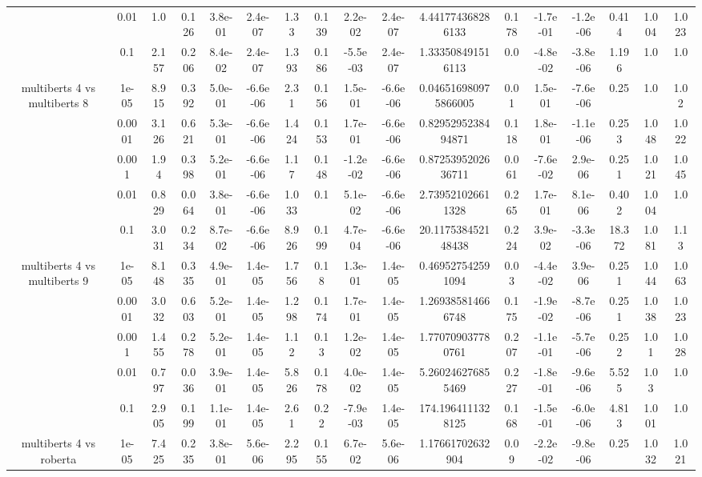 \begin{tabular}{|c|c|c|c|c|c|c|c|c|c|c|c|c|c|c|c|c|}
 & 0.01 & 1.0 & 0.126 & 3.8e-01 & 2.4e-07 & 1.33 & 0.139 & 2.2e-02 & 2.4e-07 & 4.441774368286133 & 0.178 & -1.7e-01 & -1.2e-06 & 0.414 & 1.004 & 1.023 \\
 & 0.1 & 2.157 & 0.206 & 8.4e-02 & 2.4e-07 & 1.393 & 0.186 & -5.5e-03 & 2.4e-07 & 1.333508491516113 & 0.0 & -4.8e-02 & -3.8e-06 & 1.196 & 1.0 & 1.0 \\
\hline
\multirow{5}{*}{multiberts 4 vs multiberts 8} & 1e-05 & 8.915 & 0.392 & 5.0e-01 & -6.6e-06 & 2.31 & 0.156 & 1.5e-01 & -6.6e-06 & 0.046516980975866005 & 0.01 & 1.5e-01 & -7.6e-06 & 0.25 & 1.0 & 1.02 \\
 & 0.0001 & 3.126 & 0.621 & 5.3e-01 & -6.6e-06 & 1.424 & 0.153 & 1.7e-01 & -6.6e-06 & 0.8295295238494871 & 0.118 & 1.8e-01 & -1.1e-06 & 0.253 & 1.048 & 1.022 \\
 & 0.001 & 1.94 & 0.398 & 5.2e-01 & -6.6e-06 & 1.17 & 0.148 & -1.2e-02 & -6.6e-06 & 0.8725395202636711 & 0.061 & -7.6e-02 & 2.9e-06 & 0.251 & 1.021 & 1.045 \\
 & 0.01 & 0.829 & 0.064 & 3.8e-01 & -6.6e-06 & 1.033 & 0.1 & 5.1e-02 & -6.6e-06 & 2.739521026611328 & 0.265 & 1.7e-01 & 8.1e-06 & 0.402 & 1.004 & 1.0 \\
 & 0.1 & 3.031 & 0.234 & 8.7e-02 & -6.6e-06 & 8.926 & 0.199 & 4.7e-04 & -6.6e-06 & 20.117538452148438 & 0.224 & 3.9e-02 & -3.3e-06 & 18.372 & 1.081 & 1.13 \\
\hline
\multirow{5}{*}{multiberts 4 vs multiberts 9} & 1e-05 & 8.148 & 0.335 & 4.9e-01 & 1.4e-05 & 1.756 & 0.18 & 1.3e-01 & 1.4e-05 & 0.469527542591094 & 0.03 & -4.4e-02 & 3.9e-06 & 0.251 & 1.044 & 1.063 \\
 & 0.0001 & 3.032 & 0.603 & 5.2e-01 & 1.4e-05 & 1.298 & 0.174 & 1.7e-01 & 1.4e-05 & 1.269385814666748 & 0.175 & -1.9e-02 & -8.7e-06 & 0.251 & 1.038 & 1.023 \\
 & 0.001 & 1.455 & 0.278 & 5.2e-01 & 1.4e-05 & 1.12 & 0.13 & 1.2e-02 & 1.4e-05 & 1.770709037780761 & 0.207 & -1.1e-01 & -5.7e-06 & 0.252 & 1.01 & 1.028 \\
 & 0.01 & 0.797 & 0.036 & 3.9e-01 & 1.4e-05 & 5.826 & 0.178 & 4.0e-02 & 1.4e-05 & 5.260246276855469 & 0.227 & -1.8e-01 & -9.6e-06 & 5.525 & 1.03 & 1.0 \\
 & 0.1 & 2.905 & 0.199 & 1.1e-01 & 1.4e-05 & 2.61 & 0.22 & -7.9e-03 & 1.4e-05 & 174.1964111328125 & 0.168 & -1.5e-01 & -6.0e-06 & 4.813 & 1.001 & 1.0 \\
\hline
\multirow{5}{*}{multiberts 4 vs roberta } & 1e-05 & 7.425 & 0.235 & 3.8e-01 & 5.6e-06 & 2.295 & 0.155 & 6.7e-02 & 5.6e-06 & 1.17661702632904 & 0.09 & -2.2e-02 & -9.8e-06 & 0.25 & 1.032 & 1.021 \\

\end{tabular}
